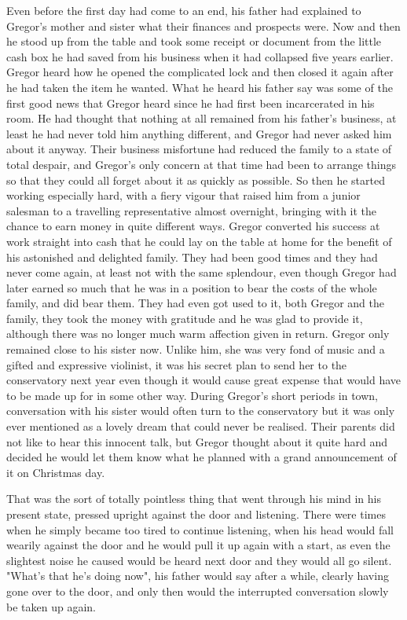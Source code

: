 \documentclass[12pt]{book}
\begin{document}
    Even before the first day had come to an end, his father had explained to Gregor's mother and sister what their finances and prospects were. Now and then he stood up from the table and took some receipt or document from the little cash box he had saved from his business when it had collapsed five years earlier. Gregor heard how he opened the complicated lock and then closed it again after he had taken the item he wanted. What he heard his father say was some of the first good news that Gregor heard since he had first been incarcerated in his room. He had thought that nothing at all remained from his father's business, at least he had never told him anything different, and Gregor had never asked him about it anyway. Their business misfortune had reduced the family to a state of total despair, and Gregor's only concern at that time had been to arrange things so that they could all forget about it as quickly as possible. So then he started working especially hard, with a fiery vigour that raised him from a junior salesman to a travelling representative almost overnight, bringing with it the chance to earn money in quite different ways. Gregor converted his success at work straight into cash that he could lay on the table at home for the benefit of his astonished and delighted family. They had been good times and they had never come again, at least not with the same splendour, even though Gregor had later earned so much that he was in a position to bear the costs of the whole family, and did bear them. They had even got used to it, both Gregor and the family, they took the money with gratitude and he was glad to provide it, although there was no longer much warm affection given in return. Gregor only remained close to his sister now. Unlike him, she was very fond of music and a gifted and expressive violinist, it was his secret plan to send her to the conservatory next year even though it would cause great expense that would have to be made up for in some other way. During Gregor's short periods in town, conversation with his sister would often turn to the conservatory but it was only ever mentioned as a lovely dream that could never be realised. Their parents did not like to hear this innocent talk, but Gregor thought about it quite hard and decided he would let them know what he planned with a grand announcement of it on Christmas day.

    That was the sort of totally pointless thing that went through his mind in his present state, pressed upright against the door and listening. There were times when he simply became too tired to continue listening, when his head would fall wearily against the door and he would pull it up again with a start, as even the slightest noise he caused would be heard next door and they would all go silent. "What's that he's doing now", his father would say after a while, clearly having gone over to the door, and only then would the interrupted conversation slowly be taken up again.
\end{document}
